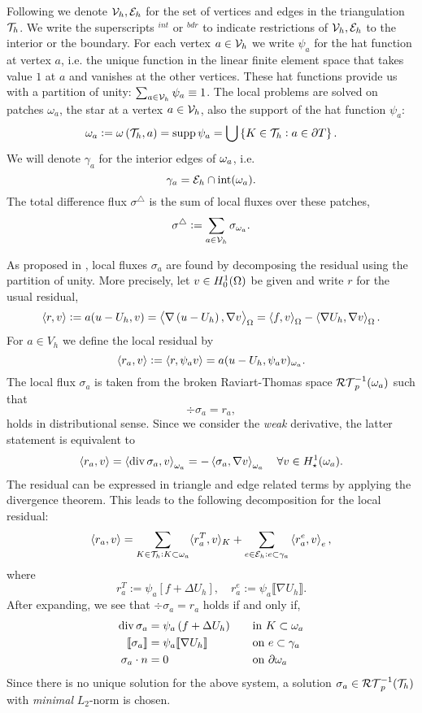 \documentclass[thesis.tex]{subfiles}
\begin{document}
Following \cite{ernequil} we denote $\mathcal{V}_h, \mathcal{E}_h$ for the set of vertices and edges in the triangulation~$\mathcal{T}_h$. 
We write the superscripts  $^{int}$ or $^{bdr}$ to indicate restrictions of $\mathcal{V}_h, \mathcal{E}_h$ to the interior or the boundary.
For each vertex $a \in \mathcal{V}_h$ we write $\psi_a$ for the hat function at vertex $a$, 
i.e. the unique function in the linear finite element space
that takes value $1$ at $a$ and vanishes at the other vertices.
These hat functions provide us with a partition of unity: $\sum_{a \in \mathcal{V}_h} \psi_a \equiv 1$.
The local problems are solved on patches $\omega_a$, the star at a vertex $a \in \mathcal{V}_h$, also the support of
the hat function $\psi_a$:
\[
  \omega_a := \omega\left( \mathcal{T}_h, a\right) = \operatorname{supp}{\psi_a} = \bigcup \set{ K \in \mathcal{T}_h : a \in \partial T}.
\]
We will denote $\gamma_a$ for the interior edges of $\omega_a$, i.e.
\[
  \gamma_a = \mathcal{E}_h \cap \text{int}(\omega_a).
\]
The total difference flux $\sigma^\triangle$ is the sum of local fluxes over these patches, 
\[
  \sigma^\triangle := \sum_{a \in \mathcal{V}_h} \sigma_{\omega_a}.
\]

As proposed  in \cite{braessequilrobust}, local fluxes $\sigma_a$ are found by decomposing the residual using the partition of unity. 
More precisely, let $v \in H_0^1(\Omega)$ be given and write $r$ for the usual residual, 
\[
  \left \langle r,v \right \rangle := a(u - U_h, v) = \left \langle \nabla \left(u - U_h\right), \nabla v \right \rangle_\Omega = \left \langle f,v \right \rangle_\Omega - \left \langle \nabla U_h,\nabla v \right \rangle_\Omega.
\]
For $a \in V_h$ we define the local residual by
\[
  \left \langle r_a,v \right \rangle := \left \langle r,\psi_a v \right \rangle = a(u - U_h, \psi_a v)_{\omega_a}.
\]
The local flux $\sigma_a$ is taken from the broken Raviart-Thomas space $\mathcal{RT}_{p}^{-1}(\omega_a)$ such that
\[
\div \sigma_a = r_a,
\]
holds in distributional sense. Since we consider the \emph{weak} derivative, the latter
statement is equivalent to
\[
  \left \langle r_a, v \right \rangle = \left \langle \operatorname{div} \sigma_a, v \right \rangle_{\omega_a} = - \left \langle \sigma_a, \nabla v \right \rangle_{\omega_a} \quad \forall v \in H_\star^1(\omega_a).
\]
The residual can be expressed in triangle and edge related terms by applying the divergence theorem.
This leads to the following decomposition for the local residual:
\begin{equation}
  \label{eq:locdecomp}
  \left \langle r_a,v \right \rangle = \sum_{K \in \mathcal{T}_h : K\subset \omega_a} \langle{r^T_a, v}\rangle_K + \sum_{e \in \mathcal{E}_h: e \subset \gamma_a} \left \langle r^e_a, v \right \rangle_e,
\end{equation}
where 
\[
  r^T_a := \psi_a \left[ f + \Delta U_h \right], \quad r^e_a := \psi_a \llbracket \nabla U_h \rrbracket.
\]
After expanding, we see that $\div \sigma_a = r_a$ holds if and only if,
\begin{alignat}{3}
  \operatorname{div} \sigma_a &= \psi_a \left (f + \Delta U_h\right) && \quad\text{in }  K\subset \omega_a \label{eq:sigmacons}\\
  \llbracket \sigma_a \rrbracket &= \psi_a \llbracket \nabla U_h \rrbracket && \quad \text{on } e \subset \gamma_a\nonumber\\
  \sigma_a \cdot n &= 0 &&\quad \text{on } \partial \omega_a\nonumber
\end{alignat}
Since there is no unique solution for the above system, a solution $\sigma_a \in \mathcal{RT}_p^{-1}(\mathcal{T}_h)$
with \emph{minimal} $L_2$-norm is chosen. 
\end{document}
